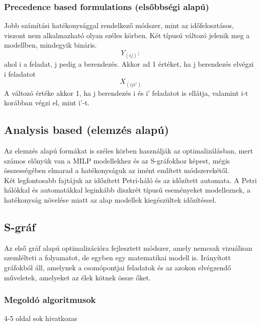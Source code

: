 \documentclass {report}
\begin{document}
  
 
  \subsubsection{Precedence based formulations (elsőbbségi alapú)}
  Jobb számítási hatékonysággal rendelkező módszer, mint az időfelosztásos, viszont nem alkalmazható olyan széles körben. Két típusú változó jelenik meg a modellben, mindegyik bináris.\\
  \begin{displaymath}
 Y_(ij):\end{displaymath} 	ahol i a feladat, j pedig a berendezés. Akkor ad 1 értéket, ha j berendezés elvégzi i feladatot \\ 
   \begin{displaymath}X_(iji')\end{displaymath}
   A változó értéke akkor 1, ha j berendezés i és i' feladatot is ellátja, valamint i-t korábban végzi el, mint i'-t.
   
  
  \subsection{Analysis based (elemzés alapú)}
  Az elemzés alapú formákat is széles körben használják az optimalizálásban, mert számos előnyük van a MILP modellekhez és az S-gráfokhoz képest, mégis összességében elmarad a hatékonyságuk az imént említett módszerekétől. \\Két legfontosabb fajtájuk az időzített Petri-háló és az időzített automata. A Petri hálókkal és automatákkal leginkább diszkrét típusú eseményeket modelleznek, a hatékonyság növelése miatt az alap modellek kiegészültek időzítéssel. 
 
  \subsection{S-gráf}
  Az első gráf alapú optimalizációra fejlesztett módszer, amely nemcsak vizuálisan szemlélteti a folyamatot, de egyben egy matematikai modell is. Irányított gráfokból áll, amelynek a csomópontjai feladatok és az azokon elvégzendő műveletek, amelyeket az élek kötnek össze őket.
  \subsubsection{Megoldó algoritmusok}
  
  

4-5 oldal
sok hivatkozas
\end{document}

